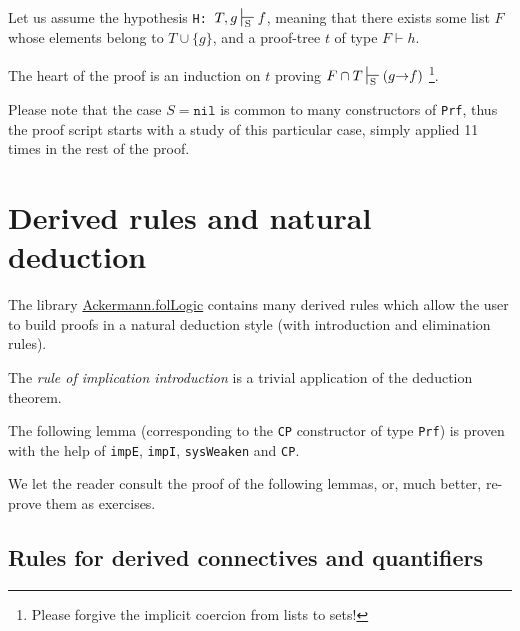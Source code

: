 Let us assume the hypothesis \texttt{H: $T, g \sdash f$},
meaning that there exists some list $F$ whose elements 
belong to $T \cup \{g\}$, and a proof-tree $t$ of type
$F \vdash h$.

The heart of the proof is an induction on $t$ proving 
$F \cap T \sdash (g\arrow f)$ \footnote{Please forgive the implicit coercion from lists to sets!}. 

Please note that the case $S=\texttt{nil}$ is common to 
many constructors of \texttt{Prf}, thus the proof script starts
with a study of this particular case, simply applied 11 times in the rest of the proof. 

 
\section{Derived rules and natural deduction}


 The library 
 \href{../theories/html/hydras.Ackermann.folLogic.html}{Ackermann.folLogic} contains many derived rules which allow the user to build proofs in a natural deduction style (with introduction and elimination rules).


The \emph{rule of implication introduction} is a trivial application of the deduction theorem.


The following lemma (corresponding to the \texttt{CP} constructor of type \texttt{Prf}) is proven with the help of \texttt{impE}, \texttt{impI}, 
\texttt{sysWeaken} and \texttt{CP}.  


We let the reader consult the proof of the following lemmas, or, much better, re-prove them as exercises.





\subsection{Rules for derived connectives and quantifiers}

